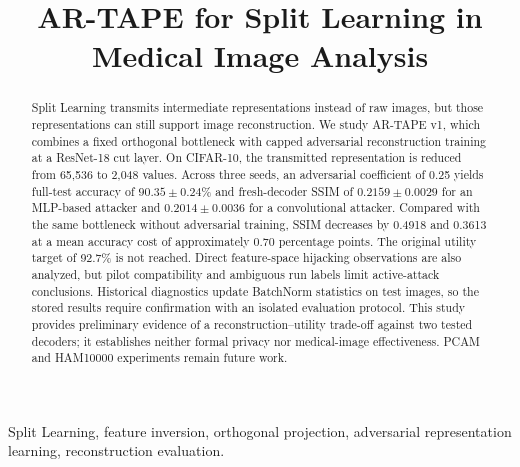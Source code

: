 \documentclass[conference]{IEEEtran}
\begin{document}
\title{AR-TAPE for Split Learning in Medical Image Analysis}
\author{
}
\maketitle

\begin{abstract}
Split Learning transmits intermediate representations instead of raw images, but those representations can still support image reconstruction. We study AR-TAPE v1, which combines a fixed orthogonal bottleneck with capped adversarial reconstruction training at a ResNet-18 cut layer. On CIFAR-10, the transmitted representation is reduced from 65,536 to 2,048 values. Across three seeds, an adversarial coefficient of 0.25 yields full-test accuracy of $90.35\pm0.24\%$ and fresh-decoder SSIM of $0.2159\pm0.0029$ for an MLP-based attacker and $0.2014\pm0.0036$ for a convolutional attacker. Compared with the same bottleneck without adversarial training, SSIM decreases by 0.4918 and 0.3613 at a mean accuracy cost of approximately 0.70 percentage points. The original utility target of 92.7\% is not reached. Direct feature-space hijacking observations are also analyzed, but pilot compatibility and ambiguous run labels limit active-attack conclusions. Historical diagnostics update BatchNorm statistics on test images, so the stored results require confirmation with an isolated evaluation protocol. This study provides preliminary evidence of a reconstruction--utility trade-off against two tested decoders; it establishes neither formal privacy nor medical-image effectiveness. PCAM and HAM10000 experiments remain future work.
\end{abstract}

\begin{IEEEkeywords}
Split Learning, feature inversion, orthogonal projection, adversarial representation learning, reconstruction evaluation.
\end{IEEEkeywords}








\end{document}
